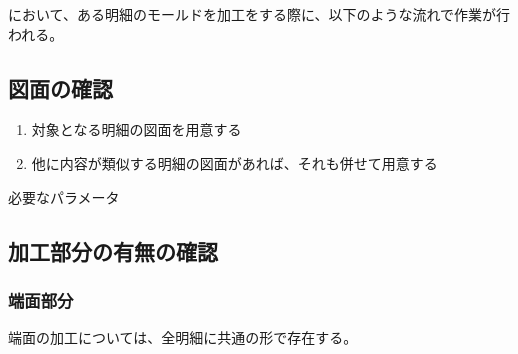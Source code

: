 \MMname において、ある明細のモールドを加工をする際に、以下のような流れで作業が行われる。


\subsection{図面の確認}
\begin{enumerate}
\item 対象となる明細の図面を用意する
\item 他に内容が類似する明細の図面があれば、それも併せて用意する
\end{enumerate}
\begin{Parameter}{必要なパラメータ}
%
%
\end{Parameter}


\subsection{加工部分の有無の確認}

\subsubsection{端面部分}
端面の加工については、全明細に共通の形で存在する。

